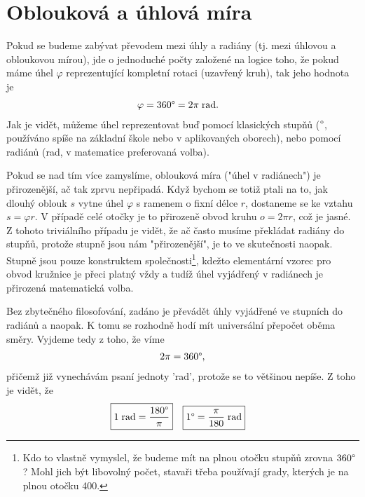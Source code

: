 \documentclass[11pt, a4paper]{article}
\begin{document}
	
	
	\section*{Oblouková a úhlová míra}
		
		Pokud se budeme zabývat převodem mezi úhly a radiány (tj. mezi úhlovou a obloukovou mírou), jde o jednoduché počty založené na logice toho, že pokud máme úhel $\varphi$ reprezentující kompletní rotaci (uzavřený kruh), tak jeho hodnota je
		\begin{align*}
			\varphi &= 360\degree = 2\pi \; \mathrm{rad}.
		\end{align*}
		Jak je vidět, můžeme úhel reprezentovat buď pomocí klasických stupňů ($\degree$, používáno spíše na základní škole nebo v aplikovaných oborech), nebo pomocí radiánů (rad, v matematice preferovaná volba).
		
		Pokud se nad tím více zamyslíme, oblouková míra ("úhel v radiánech") je přirozenější, ač tak	 zprvu nepřipadá. Když bychom se totiž ptali na to, jak dlouhý oblouk $s$ vytne úhel $\varphi$ s ramenem o fixní délce $r$, dostaneme se ke vztahu $s=\varphi r$. V případě celé otočky je to přirozeně obvod kruhu $o=2\pi r$, což je jasné. Z tohoto triviálního případu je vidět, že ač často musíme překládat radiány do stupňů, protože stupně jsou nám "přirozenější", je to ve skutečnosti naopak. Stupně jsou pouze konstruktem společnosti\footnote{Kdo to vlastně vymyslel, že budeme mít na plnou otočku stupňů zrovna $360\degree$? Mohl jich být libovolný počet, stavaři třeba používají grady, kterých je na plnou otočku 400.}, kdežto elementární vzorec pro obvod kružnice je přeci platný vždy a tudíž úhel vyjádřený v radiánech je přirozená matematická volba.
		
		Bez zbytečného filosofování, zadáno je převádět úhly vyjádřené ve stupních do radiánů a naopak. K tomu se rozhodně hodí mít universální přepočet oběma směry. Vyjdeme tedy z toho, že víme
		\begin{align*}
			2\pi = 360 \degree,
		\end{align*}
		přičemž již vynechávám psaní jednoty 'rad', protože se to většinou nepíše. Z toho je vidět, že
		\begin{align*}
			\Aboxed{1 \; \mathrm{rad} &= \frac{180\degree}{\pi}} & \Aboxed{1\degree &= \frac{\pi}{180} \; \mathrm{rad}}
		\end{align*}
	
	
\end{document}
